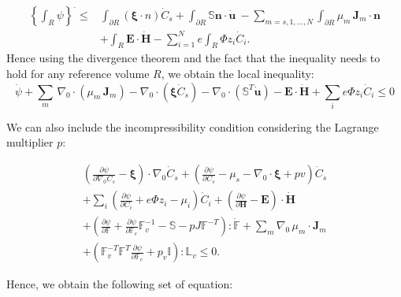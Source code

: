 \documentclass[12pt]{extarticle}
\newcommand{\F}{\ensuremath{\mathbb{F}}}
\begin{document}
\begin{equation}
\begin{aligned}
\left\{\int_R \psi\right\}^{\cdot}\leq & \int_{\partial R} \left(\boldsymbol{\xi}\cdot n\right)\dot{C}_s + \int_{\partial R} \mathbb{S}\mathbf{n} \cdot \dot{\mathbf{u}}\ - \sum\limits_{m=s,1,\ldots,N} \int_{\partial R} \mu_m \,\mathbf{J}_m \cdot \mathbf{n}\\
& + \int_R \mathbf{E} \cdot \dot{\mathbf{H}} - \sum\limits_{i=1}^{N} e  \int_R  \Phi  z_i \dot{C}_i.
\end{aligned}
\end{equation}
Hence using the divergence theorem and the fact that the inequality needs to hold for any reference volume $R$, we obtain the local inequality:
\begin{equation}
\dot{\psi} + \sum_{m}\, \nabla_0 \cdot (\mu_m\,\mathbf{J}_m) - \nabla_0 \cdot (\boldsymbol{\xi}\dot{C}_s)-\nabla_0\cdot (\mathbb{S}^T\dot{\mathbf{u}}) - \mathbf{E}\cdot \dot{\mathbf{H}} + \sum_{i} e \Phi z_i \dot{C}_i \leq 0
\end{equation}

We can also include the incompressibility condition considering the Lagrange multiplier $p$:

\begin{equation}
\begin{aligned}
\left(\frac{\partial \psi}{\partial \nabla_0 C_s}-\boldsymbol{\xi}\right) \cdot \nabla_0 \dot{C}_s + \left(\frac{\partial \psi}{\partial C_s}-\mu_s-\nabla_0 \cdot \boldsymbol{\xi}+p v\right)\dot{C}_s\\
+ \sum_i\left(\frac{\partial \psi}{\partial C_i} + e\Phi z_i-\mu_i\right) \dot{C}_i +\left(\frac{\partial \psi}{\partial \mathbf{H}}-\mathbf{E}\right) \cdot \dot{\mathbf{H}}\\
+ \left(\frac{\partial \psi}{\partial \F} + \frac{\partial \psi}{\partial\F_e}\F_v^{-1}- \mathbb{S} - p J \F^{-T}\right): \dot{\F}+ \sum_m \nabla_0 \,\mu_m \cdot \mathbf{J}_m \\
+ \left(\F_v^{-T}\F^T\frac{\partial \psi}{\partial \F_e}+p_v\mathbb{I}\right):\mathbb{L}_v\leq 0 . \label{ineq}
\end{aligned}
\end{equation}

Hence, we obtain the following set of equation:
\end{document}
